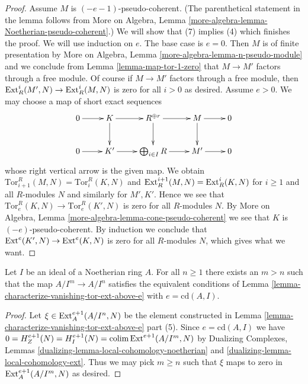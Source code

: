 \begin{proof}
\medskip\noindent
Assume $M$ is $(-e - 1)$-pseudo-coherent. (The parenthetical statement
in the lemma follows from More on Algebra, Lemma
\ref{more-algebra-lemma-Noetherian-pseudo-coherent}.)
We will show that (7) implies (4) which
finishes the proof. We will use induction on $e$.
The base case is $e = 0$. Then $M$ is of finite presentation by
More on Algebra, Lemma \ref{more-algebra-lemma-n-pseudo-module}
and we conclude from Lemma \ref{lemma-map-tor-1-zero} that
$M \to M'$ factors through a free module. Of course if $M \to M'$
factors through a free module, then $\mathop{\mathrm{Ext}}\nolimits^i_R(M', N) \to \mathop{\mathrm{Ext}}\nolimits^i_R(M, N)$
is zero for all $i > 0$ as desired.
Assume $e > 0$. We may choose a map of short exact sequences
$$
\xymatrix{
0 \ar[r] &
K \ar[r] \ar[d] &
R^{\oplus r} \ar[r] \ar[d] &
M \ar[r] \ar[d] &
0 \\
0 \ar[r] &
K' \ar[r] &
\bigoplus_{i \in I} R \ar[r] &
M' \ar[r] &
0
}
$$
whose right vertical arrow is the given map. We obtain
$\text{Tor}_{i + 1}^R(M, N) = \text{Tor}^R_i(K, N)$
and $\mathop{\mathrm{Ext}}\nolimits^{i + 1}_R(M, N) = \mathop{\mathrm{Ext}}\nolimits^i_R(K, N)$ for $i \geq 1$
and all $R$-modules $N$ and similarly for $M', K'$.
Hence we see that $\text{Tor}_e^R(K, N) \to \text{Tor}_e^R(K', N)$
is zero for all $R$-modules $N$. By More on Algebra, Lemma
\ref{more-algebra-lemma-cone-pseudo-coherent} we see that $K$
is $(-e)$-pseudo-coherent. By induction we conclude that
$\mathop{\mathrm{Ext}}\nolimits^e(K', N) \to \mathop{\mathrm{Ext}}\nolimits^e(K, N)$ is zero for all $R$-modules
$N$, which gives what we want.
\end{proof}

\begin{lemma}
\label{lemma-cd-sequence-Koszul}
Let $I$ be an ideal of a Noetherian ring $A$.
For all $n \geq 1$ there exists an $m > n$ such that the map
$A/I^m \to A/I^n$ satisfies the equivalent conditions of
Lemma \ref{lemma-characterize-vanishing-tor-ext-above-e} with
$e = \text{cd}(A, I)$.
\end{lemma}

\begin{proof}
Let $\xi \in \mathop{\mathrm{Ext}}\nolimits^{e + 1}_A(A/I^n, N)$ be the element constructed in
Lemma \ref{lemma-characterize-vanishing-tor-ext-above-e} part (5).
Since $e = \text{cd}(A, I)$ we have
$0 = H^{e + 1}_Z(N) = H^{e + 1}_I(N) = \mathop{\mathrm{colim}}\nolimits \mathop{\mathrm{Ext}}\nolimits^{e + 1}(A/I^m, N)$
by Dualizing Complexes, Lemmas
\ref{dualizing-lemma-local-cohomology-noetherian} and
\ref{dualizing-lemma-local-cohomology-ext}.
Thus we may pick $m \geq n$ such that $\xi$ maps to
zero in $\mathop{\mathrm{Ext}}\nolimits^{e + 1}_A(A/I^m, N)$ as desired.
\end{proof}






